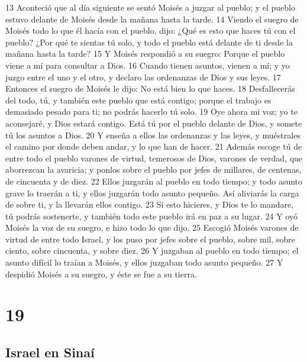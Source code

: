 13 Aconteció que al día siguiente se sentó Moisés a juzgar al pueblo; y el pueblo estuvo delante de Moisés desde la mañana hasta la tarde.
14 Viendo el suegro de Moisés todo lo que él hacía con el pueblo, dijo: ¿Qué es esto que haces tú con el pueblo? ¿Por qué te sientas tú solo, y todo el pueblo está delante de ti desde la mañana hasta la tarde?
15 Y Moisés respondió a su suegro: Porque el pueblo viene a mí para consultar a Dios.
16 Cuando tienen asuntos, vienen a mí; y yo juzgo entre el uno y el otro, y declaro las ordenanzas de Dios y sus leyes.
17 Entonces el suegro de Moisés le dijo: No está bien lo que haces.
18 Desfallecerás del todo, tú, y también este pueblo que está contigo; porque el trabajo es demasiado pesado para ti; no podrás hacerlo tú solo.
19 Oye ahora mi voz; yo te aconsejaré, y Dios estará contigo. Está tú por el pueblo delante de Dios, y somete tú los asuntos a Dios.
20 Y enseña a ellos las ordenanzas y las leyes, y muéstrales el camino por donde deben andar, y lo que han de hacer.
21 Además escoge tú de entre todo el pueblo varones de virtud, temerosos de Dios, varones de verdad, que aborrezcan la avaricia; y ponlos sobre el pueblo por jefes de millares, de centenas, de cincuenta y de diez.
22 Ellos juzgarán al pueblo en todo tiempo; y todo asunto grave lo traerán a ti, y ellos juzgarán todo asunto pequeño. Así aliviarás la carga de sobre ti, y la llevarán ellos contigo.
23 Si esto hicieres, y Dios te lo mandare, tú podrás sostenerte, y también todo este pueblo irá en paz a su lugar.
24 Y oyó Moisés la voz de su suegro, e hizo todo lo que dijo.
25 Escogió Moisés varones de virtud de entre todo Israel, y los puso por jefes sobre el pueblo, sobre mil, sobre ciento, sobre cincuenta, y sobre diez.
26 Y juzgaban al pueblo en todo tiempo; el asunto difícil lo traían a Moisés, y ellos juzgaban todo asunto pequeño.
27 Y despidió Moisés a su suegro, y éste se fue a su tierra.

\chapter{19}

\section*{Israel en Sinaí}

